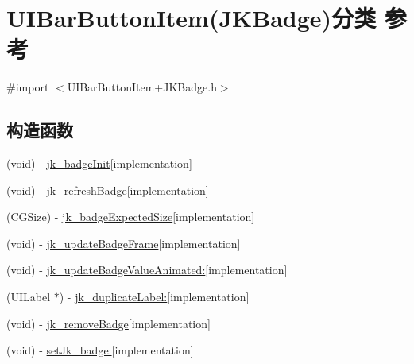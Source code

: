 \hypertarget{category_u_i_bar_button_item_07_j_k_badge_08}{}\section{U\+I\+Bar\+Button\+Item(J\+K\+Badge)分类 参考}
\label{category_u_i_bar_button_item_07_j_k_badge_08}


{\ttfamily \#import $<$U\+I\+Bar\+Button\+Item+\+J\+K\+Badge.\+h$>$}

\subsection*{构造函数}
\begin{DoxyCompactItemize}
\item 
(void) -\/ \hyperlink{category_u_i_bar_button_item_07_j_k_badge_08_aa6a3c5d591420fb348dd4d328757252f}{jk\+\_\+badge\+Init}{\ttfamily  \mbox{[}implementation\mbox{]}}
\item 
(void) -\/ \hyperlink{category_u_i_bar_button_item_07_j_k_badge_08_ad9f1fd86cc974454f125ba780434af16}{jk\+\_\+refresh\+Badge}{\ttfamily  \mbox{[}implementation\mbox{]}}
\item 
(C\+G\+Size) -\/ \hyperlink{category_u_i_bar_button_item_07_j_k_badge_08_a57f7453f0fd6c5b21e49651430c8db44}{jk\+\_\+badge\+Expected\+Size}{\ttfamily  \mbox{[}implementation\mbox{]}}
\item 
(void) -\/ \hyperlink{category_u_i_bar_button_item_07_j_k_badge_08_aeb59608cf6422e9634056508562dc245}{jk\+\_\+update\+Badge\+Frame}{\ttfamily  \mbox{[}implementation\mbox{]}}
\item 
(void) -\/ \hyperlink{category_u_i_bar_button_item_07_j_k_badge_08_ae92093575012970e6e9614769d2266fc}{jk\+\_\+update\+Badge\+Value\+Animated\+:}{\ttfamily  \mbox{[}implementation\mbox{]}}
\item 
(U\+I\+Label $\ast$) -\/ \hyperlink{category_u_i_bar_button_item_07_j_k_badge_08_a0513163bf3a362d851499ed10bb27cbd}{jk\+\_\+duplicate\+Label\+:}{\ttfamily  \mbox{[}implementation\mbox{]}}
\item 
(void) -\/ \hyperlink{category_u_i_bar_button_item_07_j_k_badge_08_a49296a812acc2a3a9ebcde0638fcd9f4}{jk\+\_\+remove\+Badge}{\ttfamily  \mbox{[}implementation\mbox{]}}
\item 
(void) -\/ \hyperlink{category_u_i_bar_button_item_07_j_k_badge_08_ae61f281b06d4654b2a865fce9e73b9ec}{set\+Jk\+\_\+badge\+:}{\ttfamily  \mbox{[}implementation\mbox{]}}
\item 

\end{DoxyCompactItemize}
